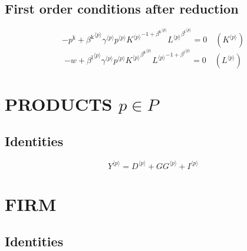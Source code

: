 \subsection{First order conditions after reduction}

\begin{equation}
-p^{\mathrm{k}} + {{\beta^{\mathrm{k}}}^{\langle p\rangle}} {{\gamma}^{\langle p\rangle}} {{p}^{\langle p\rangle}} {{{K}^{\langle p\rangle}}^{-1 + {\beta^{\mathrm{k}}}^{\langle p\rangle}}} {{{L}^{\langle p\rangle}}^{{\beta^{\mathrm{l}}}^{\langle p\rangle}}} = 0
 \quad \left({K}^{\langle p\rangle}\right)
\end{equation}
\begin{equation}
-w + {{\beta^{\mathrm{l}}}^{\langle p\rangle}} {{\gamma}^{\langle p\rangle}} {{p}^{\langle p\rangle}} {{{K}^{\langle p\rangle}}^{{\beta^{\mathrm{k}}}^{\langle p\rangle}}} {{{L}^{\langle p\rangle}}^{-1 + {\beta^{\mathrm{l}}}^{\langle p\rangle}}} = 0
 \quad \left({L}^{\langle p\rangle}\right)
\end{equation}




\section{PRODUCTS $p\in P$}

\subsection{Identities}

\begin{equation}
{Y}^{\langle p\rangle} = {D}^{\langle p\rangle} + {{G\!G}}^{\langle p\rangle} + {I}^{\langle p\rangle}
\end{equation}




\section{FIRM}

\subsection{Identities}

